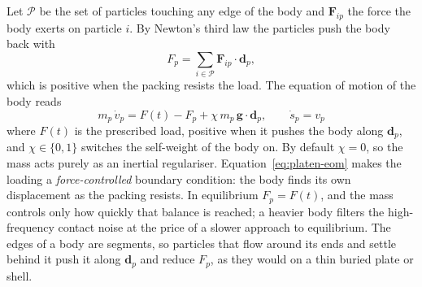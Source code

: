 Let $\mathcal{P}$ be the set of particles touching any edge of the body and
$\mathbf{F}_{ip}$ the force the body exerts on particle $i$.  By Newton's third
law the particles push the body back with
\begin{equation}
  F_{p} = \sum_{i\in\mathcal{P}} \mathbf{F}_{ip}\cdot\mathbf{d}_{p},
  \label{eq:platen-reaction}
\end{equation}
which is positive when the packing resists the load.  The equation of motion of
the body reads
\begin{equation}
  \boxed{\;
  m_{p}\,\dot v_{p} = F(t) - F_{p} + \chi\, m_{p}\,\mathbf{g}\cdot\mathbf{d}_{p},
  \qquad
  \dot s_{p} = v_{p} \;}
  \label{eq:platen-eom}
\end{equation}
where $F(t)$ is the prescribed load, positive when it pushes the body along
$\mathbf{d}_{p}$, and $\chi\in\{0,1\}$ switches the self-weight of the body on.
By default $\chi=0$, so the mass acts purely as an inertial regulariser.
Equation~\eqref{eq:platen-eom} makes the loading a \emph{force-controlled}
boundary condition: the body finds its own displacement as the packing resists.
In equilibrium $F_{p}=F(t)$, and the mass controls only how quickly that balance
is reached; a heavier body filters the high-frequency contact noise at the price
of a slower approach to equilibrium.  The edges of a body are segments, so
particles that flow around its ends and settle behind it push it along
$\mathbf{d}_{p}$ and reduce $F_{p}$, as they would on a thin buried plate or
shell.

